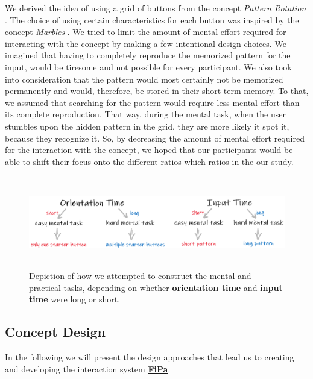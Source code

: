 We derived the idea of using a grid of buttons from the concept \textit{Pattern Rotation} \cite{patternRotation, anonymous}. The choice of using certain characteristics for each button was inspired by the concept \textit{Marbles} \cite{patternRotation, anonymous}. We tried to limit the amount of mental effort required for interacting with the concept by making a few intentional design choices. We imagined that having to completely reproduce the memorized pattern for the input, would be tiresome and not possible for every participant. We also took into consideration that the pattern would most certainly not be memorized permanently and would, therefore, be stored in their short-term memory. To that, we assumed that searching for the pattern would require less mental effort than its complete reproduction. That way, during the mental task, when the user stumbles upon the hidden pattern in the grid, they are more likely it spot it, because they recognize it. So, by decreasing the amount of mental effort required for the interaction with the concept, we hoped that our participants would be able to shift their focus onto the different ratios which ratios in the our study.

\begin{figure}[t!]
\centering
\includegraphics[width=12cm, height=4cm]{Chapters/graphics/OriInput.PNG}
\caption{Depiction of how we attempted to construct the mental and practical tasks, depending on whether \textbf{orientation time} and \textbf{input time} were long or short.}
\label{fig:orientation_input}
\end{figure}


\subsection{Concept Design} \label{4.2.2}
In the following we will present the design approaches that lead us to creating and developing the interaction system \underline{\textbf{FiPa}}.

